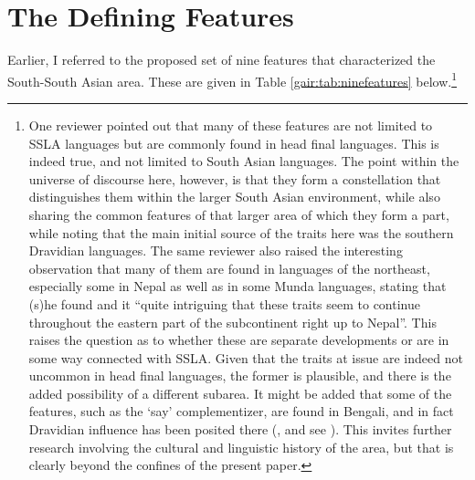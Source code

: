 \section{The Defining Features}\label{gair:sec:2.2}
Earlier, I referred to the proposed set of nine features that characterized the South-South Asian area. These are given in Table \ref{gair:tab:ninefeatures} below.\footnote{One
  reviewer pointed out that many of these features are not limited to SSLA languages but are commonly found in head final languages. This is indeed true, and not limited to South Asian languages. The point within the universe of discourse here, however, is that they form a constellation that distinguishes them within the larger South Asian environment, while also sharing the common features of that larger area of which they form a part, while noting that the main initial  source of the traits here was the southern Dravidian languages. The same reviewer also raised the interesting observation that many of them are found in languages of the northeast, especially some in Nepal as well as in some Munda languages, stating that (s)he found and  it ``quite intriguing that these traits seem to continue throughout the eastern part of the subcontinent right up to Nepal''. This raises the question as to whether these are separate developments or are in some way connected with SSLA. Given that the traits at issue are indeed not uncommon in head final languages, the former is plausible, and there is the added possibility of a different subarea. It might be added that some of the features, such as the `say' complementizer, are found in Bengali, and in fact Dravidian influence has been posited there (\citet{Klaiman1977}, and see \citet{Bayer2001}).  This invites further research involving the cultural and linguistic history of the area, but that is clearly beyond the confines of the present paper.
} 
